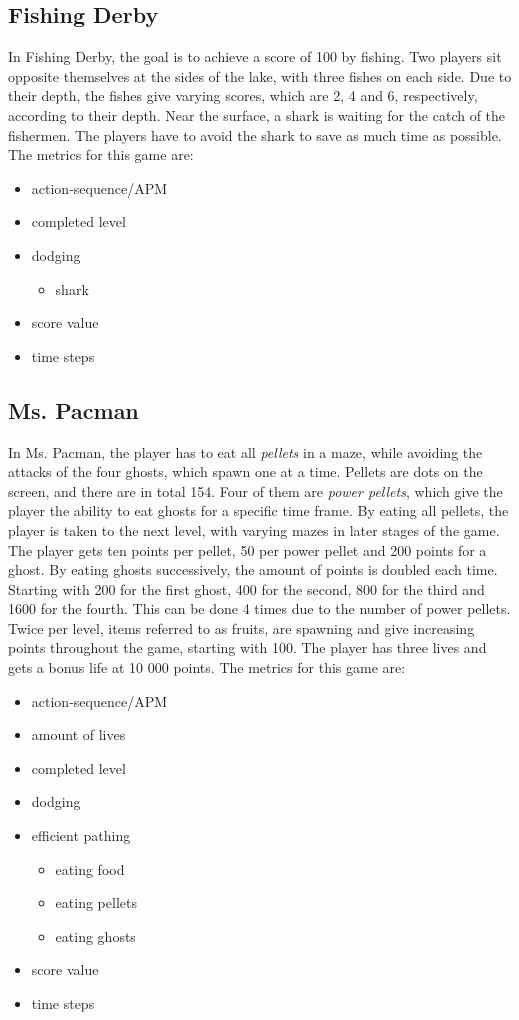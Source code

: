 \subsection{Fishing Derby}
In Fishing Derby, the goal is to achieve a score of 100 by fishing. Two players sit opposite themselves at the sides of the lake, with three fishes on each side. Due to their depth, the fishes give varying scores, which are 2, 4 and 6, respectively, according to their depth. Near the surface, a shark is waiting for the catch of the fishermen. The players have to avoid the shark to save as much time as possible. The metrics for this game are:
\begin{itemize} 
	\item action-sequence/APM
	\item completed level
	\item dodging
	\begin{itemize}
		\item shark
	\end{itemize}
	\item score value
	\item time steps
\end{itemize}

\subsection{Ms. Pacman} \label{ssec:pacman}
In Ms. Pacman, the player has to eat all \textit{pellets} in a maze, while avoiding the attacks of the four ghosts, which spawn one at a time. Pellets are dots on the screen, and there are in total 154. Four of them are \textit{power pellets}, which give the player the ability to eat ghosts for a specific time frame. By eating all pellets, the player is taken to the next level, with varying mazes in later stages of the game. The player gets ten points per pellet, 50 per power pellet and 200 points for a ghost. By eating ghosts successively, the amount of points is doubled each time. Starting with 200 for the first ghost, 400 for the second, 800 for the third and 1600 for the fourth. This can be done 4 times due to the number of power pellets. Twice per level, items referred to as fruits, are spawning and give increasing points throughout the game, starting with 100. The player has three lives and gets a bonus life at 10 000 points. The metrics for this game are:
\begin{itemize}
	\item action-sequence/APM
	\item amount of lives
	\item completed level
	\item dodging
	\item efficient pathing
	\begin{itemize}
		\item eating food
		\item eating pellets
		\item eating ghosts
	\end{itemize}
	\item score value
	\item time steps
\end{itemize}

